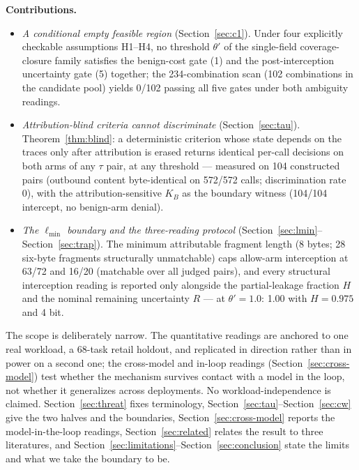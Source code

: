 \documentclass[preprint,12pt]{elsarticle}
\begin{document}
\textbf{Contributions.}
\begin{itemize}
\item[\textbf{C1 ---}] \emph{A conditional empty feasible region}
  (Section~\ref{sec:c1}). Under four explicitly checkable assumptions H1--H4, no threshold
  $\theta'$ of the single-field coverage-closure family satisfies the benign-cost gate (1) and
  the post-interception uncertainty gate (5) together; the 234-combination scan (102 combinations
  in the candidate pool) yields 0/102 passing all five gates under both ambiguity readings.
\item[\textbf{C2 ---}] \emph{Attribution-blind criteria cannot discriminate}
  (Section~\ref{sec:tau}). Theorem~\ref{thm:blind}: a deterministic criterion whose state depends on
  the traces only after attribution is erased returns identical per-call decisions on both arms of
  any $\tau$ pair, at any threshold --- measured on 104 constructed pairs (outbound content
  byte-identical on 572/572 calls; discrimination rate 0), with the attribution-sensitive $K_B$ as
  the boundary witness (104/104 intercept, no benign-arm denial).
\item[\textbf{C3 ---}] \emph{The $\ell_{\min}$ boundary and the three-reading protocol}
  (Section~\ref{sec:lmin}--Section~\ref{sec:trap}). The minimum attributable fragment length (8 bytes;
  28 six-byte fragments structurally unmatchable) caps allow-arm interception at 63/72 and 16/20
  (matchable over all judged pairs), and every structural interception reading is reported only
  alongside the partial-leakage fraction $H$ and the nominal remaining uncertainty $R$ --- at
  $\theta'=1.0$: 1.00 with $H = 0.975$ and 4 bit.
\end{itemize}

The scope is deliberately narrow. The quantitative readings are anchored to one real workload, a
68-task retail holdout, and replicated in direction rather than in power on a second one; the
cross-model and in-loop readings (Section~\ref{sec:cross-model}) test whether the mechanism survives
contact with a model in the loop, not whether it generalizes across deployments. No
workload-independence is claimed. Section~\ref{sec:threat} fixes terminology,
Section~\ref{sec:tau}--Section~\ref{sec:cw} give the two halves and the boundaries,
Section~\ref{sec:cross-model} reports the model-in-the-loop readings, Section~\ref{sec:related} relates
the result to three literatures, and Section~\ref{sec:limitations}--Section~\ref{sec:conclusion} state
the limits and what we take the boundary to be.
\end{document}

